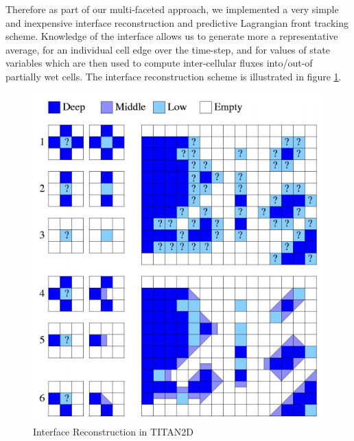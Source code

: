\documentclass[letterpaper,10pt]{article}
\begin{document}
Therefore as part of our multi-faceted approach, we implemented a very 
simple and inexpensive interface reconstruction and predictive 
Lagrangian front tracking scheme.  Knowledge of the interface allows
us to generate more a representative average, for an individual cell edge 
over the time-step, and for values of state variables which are then used to 
compute inter-cellular fluxes into/out-of partially wet cells.  The 
interface reconstruction scheme is illustrated in figure \ref{interface}.\newline

\begin{figure}[!h]
	\centerline{\includegraphics[scale=0.3]{IMAGES/flux.png}}
	\caption{Interface Reconstruction in TITAN2D}
	\label{interface}
\end{figure} 
\end{document}
